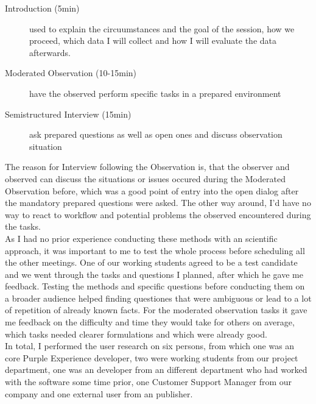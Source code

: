 \begin{description}
  \item [Introduction (\texttildelow 5min)] used to explain the circuumstances and the goal of the session, how we proceed, which data I will collect and how I will evaluate the data afterwards.
  \item [Moderated Observation (10-15min)] have the observed perform specific tasks in a prepared environment
  \item [Semistructured Interview (\texttildelow 15min)] ask prepared questions as well as open ones and discuss observation situation
\end{description}
The reason for Interview following the Observation is, that the observer and observed can discuss the situations or issues occured during the Moderated Observation before,
which was a good point of entry into the open dialog after the mandatory prepared questions were asked. The other way around, I'd have no way to react to workflow and potential problems the observed encountered during the tasks.
\\
As I had no prior experience conducting these methods with an scientific approach, it was important to me to test the whole process before scheduling all the other meetings. One of our working students agreed to be a test candidate and we went through the tasks and questions I planned, after which he gave me feedback.
Testing the methods and specific questions before conducting them on a broader audience helped finding questiones that were ambiguous or lead to a lot of repetition of already known facts. For the moderated observation tasks it gave me feedback on the difficulty and time they would take for others on average, which tasks needed clearer formulations and which were already good.
\\
In total, I performed the user research on six persons, from which one was an core Purple Experience developer, two were working students from our project department, one was an developer from an different department who had worked with the software some time prior, one Customer Support Manager from our company and one external user from an publisher.

